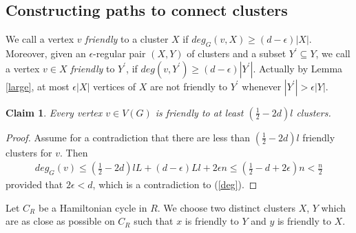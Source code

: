 \documentclass[11pt]{article}
\newtheorem{claim}[lemma]{Claim}
\begin{document}
%
%

\subsection{Constructing paths to connect clusters}

We call a vertex $v$ {\em friendly} to a cluster $X$ if $deg_G(v,X)\geq (d-\epsilon)|X|$. Moreover, given an $\epsilon $-regular pair $(X,Y)$ of clusters and a subset $Y^{'}\subseteq Y$, we call a vertex $v\in X$ {\em friendly} to $Y^{'}$, if $deg(v,Y^{'})\geq (d-\epsilon )|Y^{'}|$. Actually by Lemma \ref{large}, at most $\epsilon |X|$ vertices of $X$ are not friendly to $Y^{'}$ whenever $|Y^{'}|>\epsilon |Y|$.

\begin{claim}\label{friendly}
Every vertex $v\in V(G)$ is friendly to at least $(\frac{1}{2}-2d)l$ clusters.
\end{claim}

\begin{proof}
Assume for a contradiction that there are less than $(\frac{1}{2}-2d)l$ friendly clusters for $v$. Then
\begin{align*}
deg_G(v) \leq (\frac{1}{2}-2d)lL+(d-\epsilon )Ll+2\epsilon n\leq (\frac{1}{2}-d+2\epsilon )n<\frac{n}{2}
\end{align*}
provided that $2\epsilon <d$, which is a contradiction to (\ref{deg}).
\end{proof}

Let $C_R$ be a Hamiltonian cycle in $R$. We choose two distinct clusters $X$, $Y$ which are as close as possible on $C_R$ such that $x$ is friendly to $Y$ and $y$ is friendly to $X$.
\end{document}
